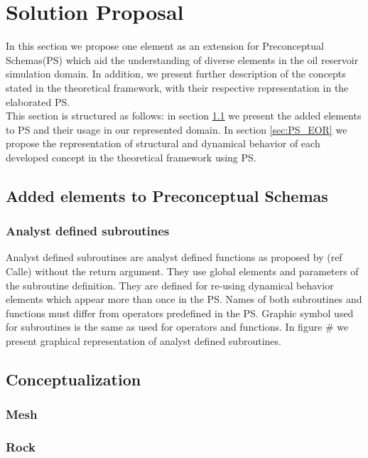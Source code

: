\chapter{Solution Proposal}

In this section we propose one element as an extension for Preconceptual Schemas(PS) which aid the understanding of diverse elements in the oil reservoir simulation domain. In addition, we present further description of the concepts stated in the theoretical framework, with their respective representation in the elaborated PS.
\\
This section is structured as follows: in section \ref{sec:PSNew} we present the added elements to PS and their usage in our represented domain. In section \ref{sec:PS_EOR} we propose the representation of structural and dynamical behavior of each developed concept in the theoretical framework using PS.

\section{Added elements to Preconceptual Schemas}\label{sec:PSNew}
\subsection{Analyst defined subroutines}\label{sec:PS_ADS}
Analyst defined subroutines are analyst defined functions as proposed by (ref Calle) without the return argument. They use global elements and parameters of the subroutine definition. They are defined for re-using dynamical behavior elements which appear more than once in the PS. Names of both subroutines and functions must differ from operators predefined in the PS. Graphic symbol used for subroutines is the same as used for operators and functions. In figure \# we present graphical representation of analyst defined subroutines.

\section{Conceptualization}
%
\subsection{Mesh}
%
\subsection{Rock}
%
